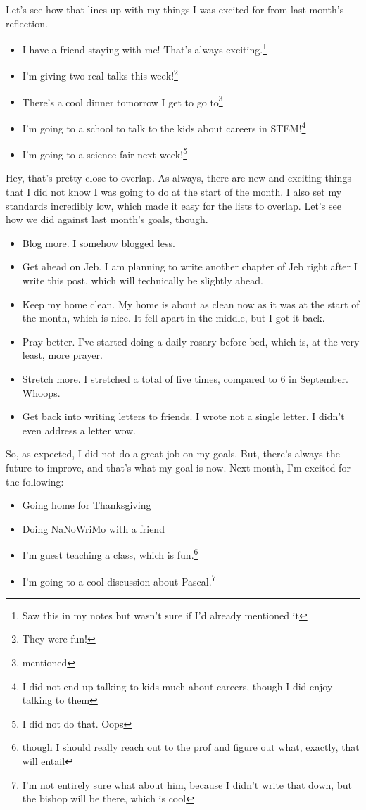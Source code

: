 \documentclass[12pt]{article}[titlepage]
\renewcommand{\,}{\textsuperscript{,}}
\begin{document}
Let's see how that lines up with my things I was excited for from last month's reflection.
\begin{itemize}
\item I have a friend staying with me! That's always exciting.\footnote{Saw this in my notes but wasn't sure if I'd already mentioned it}
\item I'm giving two real talks this week!\footnote{They were fun!}
\item There's a cool dinner tomorrow I get to go to\footnote{mentioned}
\item I'm going to a school to talk to the kids about careers in STEM!\footnote{I did not end up talking to kids much about careers, though I did enjoy talking to them}
\item I'm going to a science fair next week!\footnote{I did not do that. Oops}
\end{itemize}
Hey, that's pretty close to overlap.
As always, there are new and exciting things that I did not know I was going to do at the start of the month.
I also set my standards incredibly low, which made it easy for the lists to overlap.
Let's see how we did against last month's goals, though.
\begin{itemize}
\item Blog more.
I somehow blogged less.
\item Get ahead on Jeb.
I am planning to write another chapter of Jeb right after I write this post, which will technically be slightly ahead.
\item Keep my home clean.
My home is about as clean now as it was at the start of the month, which is nice. It fell apart in the middle, but I got it back.
\item Pray better.
I've started doing a daily rosary before bed, which is, at the very least, more prayer.
\item Stretch more.
I stretched a total of five times, compared to 6 in September. Whoops.
\item Get back into writing letters to friends.
I wrote not a single letter.
I didn't even address a letter wow.
\end{itemize}

So, as expected, I did not do a great job on my goals.
But, there's always the future to improve, and that's what my goal is now.
Next month, I'm excited for the following:
\begin{itemize}
\item Going home for Thanksgiving
\item Doing NaNoWriMo with a friend
\item I'm guest teaching a class, which is fun.\footnote{though I should really reach out to the prof and figure out what, exactly, that will entail}
\item I'm going to a cool discussion about Pascal.\footnote{I'm not entirely sure what about him, because I didn't write that down, but the bishop will be there, which is cool}
\end{itemize}
\end{document}
